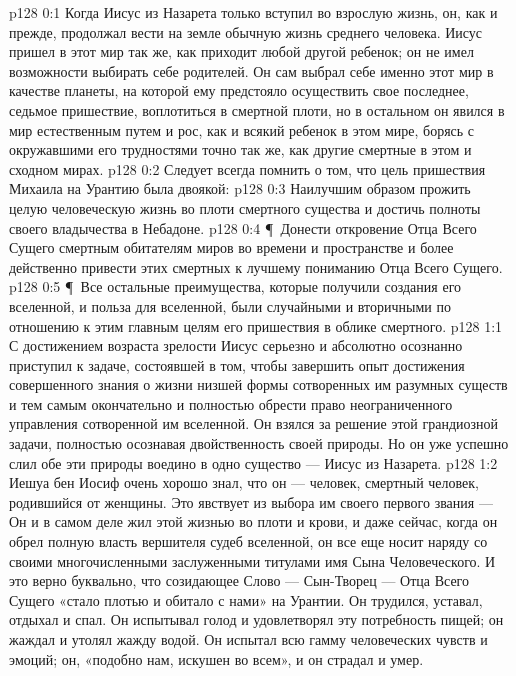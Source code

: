 \vs p128 0:1 Когда Иисус из Назарета только вступил во взрослую жизнь, он, как и прежде, продолжал вести на земле обычную жизнь среднего человека. Иисус пришел в этот мир так же, как приходит любой другой ребенок; он не имел возможности выбирать себе родителей. Он сам выбрал себе именно этот мир в качестве планеты, на которой ему предстояло осуществить свое последнее, седьмое пришествие, воплотиться в смертной плоти, но в остальном он явился в мир естественным путем и рос, как и всякий ребенок в этом мире, борясь с окружавшими его трудностями точно так же, как другие смертные в этом и сходном мирах.
\vs p128 0:2 Следует всегда помнить о том, что цель пришествия Михаила на Урантию была двоякой:
\vs p128 0:3 \bibnobreakspace Наилучшим образом прожить целую человеческую жизнь во плоти смертного существа и достичь полноты своего владычества в Небадоне.
\vs p128 0:4 \P\ \bibnobreakspace Донести откровение Отца Всего Сущего смертным обитателям миров во времени и пространстве и более действенно привести этих смертных к лучшему пониманию Отца Всего Сущего.
\vs p128 0:5 \P\ Все остальные преимущества, которые получили создания его вселенной, и польза для вселенной, были случайными и вторичными по отношению к этим главным целям его пришествия в облике смертного.
\vs p128 1:1 С достижением возраста зрелости Иисус серьезно и абсолютно осознанно приступил к задаче, состоявшей в том, чтобы завершить опыт достижения совершенного знания о жизни низшей формы сотворенных им разумных существ и тем самым окончательно и полностью обрести право неограниченного управления сотворенной им вселенной. Он взялся за решение этой грандиозной задачи, полностью осознавая двойственность своей природы. Но он уже успешно слил обе эти природы воедино в одно существо --- Иисус из Назарета.
\vs p128 1:2 Иешуа бен Иосиф очень хорошо знал, что он --- человек, смертный человек, родившийся от женщины. Это явствует из выбора им своего первого звания ---  Он и в самом деле жил этой жизнью во плоти и крови, и даже сейчас, когда он обрел полную власть вершителя судеб вселенной, он все еще носит наряду со своими многочисленными заслуженными титулами имя Сына Человеческого. И это верно буквально, что созидающее Слово --- Сын\hyp{}Творец --- Отца Всего Сущего «стало плотью и обитало с нами» на Урантии. Он трудился, уставал, отдыхал и спал. Он испытывал голод и удовлетворял эту потребность пищей; он жаждал и утолял жажду водой. Он испытал всю гамму человеческих чувств и эмоций; он, «подобно нам, искушен во всем», и он страдал и умер.
